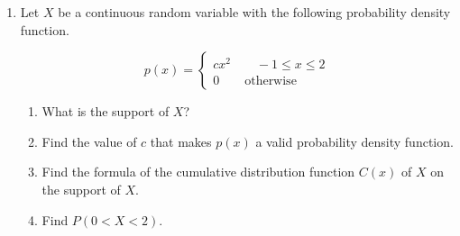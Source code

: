 \documentclass[11pt]{article}
\begin{document}
\begin{enumerate}
Let $X$ be a discrete random variable representing the amount a lottery ticket pays out.

\begin{enumerate}
    \item What are the possible values of $X$?

    \vfill

    \item Write down the probability mass function $p(x)$ of $X$ using either a table or a piecewise function.

    \vfill
    \vfill

    \item Find the expectation of $X$.

    \vfill
    \vfill

    \item Find the variance of $X$.

    \vfill
    \vfill

\end{enumerate}


\newpage


\item Let $X$ be a continuous random variable with the following probability density function.

\[p(x)=\begin{cases}cx^2\qquad -1\le x\le 2\\ 0 \qquad \text{otherwise}\end{cases}\]

\begin{enumerate}
    \item What is the support of $X$?

    \vfill

    \item Find the value of $c$ that makes $p(x)$ a valid probability density function.

    \vfill
    
    \item Find the formula of the cumulative distribution function $C(x)$ of $X$ on the support of $X$.

    \vfill

    \item Find $P(0<X<2)$.

    \vfill
\end{enumerate}


\end{enumerate}
\end{document}

